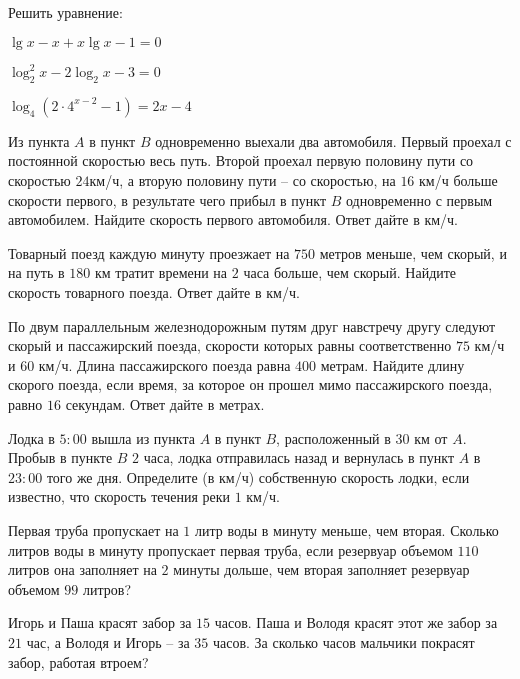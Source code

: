 \begin{listofex}
	\item Решить уравнение:
	\begin{enumcols}[itemcolumns=2]
		\item {}
		\item {}
		\item {}
		\item \( \lg x - x + x\lg x - 1 = 0 \)
		\item \( \log^2_2x-2\log_2 x - 3 = 0 \)
		\item \( \log_4(2\cdot4^{x-2}-1)=2x-4 \)
		\item {}
		\item {}
		\item {}
	\end{enumcols}
	\item {}
	\item {}
	\item Из пункта \( A \) в пункт \( B \) одновременно выехали два автомобиля. Первый проехал с постоянной скоростью весь путь. Второй проехал первую половину пути со скоростью \( 24 \)км/ч, а вторую половину пути – со скоростью, на \(16\) км/ч больше скорости первого, в результате чего прибыл в пункт \( B \) одновременно с первым автомобилем. Найдите скорость первого автомобиля. Ответ дайте в км/ч.
	\item Товарный поезд каждую минуту проезжает на \( 750 \) метров меньше, чем скорый, и на путь в \( 180 \) км тратит времени на \( 2 \) часа больше, чем скорый. Найдите скорость товарного поезда. Ответ дайте в км/ч.
	\item По двум параллельным железнодорожным путям друг навстречу другу следуют скорый и пассажирский поезда, скорости которых равны соответственно \( 75  \) км/ч и \( 60  \) км/ч. Длина пассажирского поезда равна \( 400  \) метрам. Найдите длину скорого поезда, если время, за которое он прошел мимо пассажирского поезда, равно \( 16  \) секундам. Ответ дайте в метрах.
	\item Лодка в \( 5:00  \) вышла из пункта \( A \) в пункт \( B \), расположенный в \( 30  \) км от \( A \). Пробыв в пункте \( B \) \( 2 \) часа, лодка отправилась назад и вернулась в пункт \( A \) в \( 23:00 \) того же дня. Определите (в км/ч) собственную скорость лодки, если известно, что скорость течения реки \( 1 \) км/ч.
	\item Первая труба пропускает на \(1\) литр воды в минуту меньше, чем вторая. Сколько литров воды в минуту пропускает первая труба, если резервуар объемом \(110\) литров она заполняет на \( 2 \) минуты дольше, чем вторая заполняет резервуар объемом \(99\) литров?
	\item Игорь и Паша красят забор за \( 15 \) часов. Паша и Володя красят этот же забор за \( 21 \) час, а Володя и Игорь – за \( 35 \) часов. За сколько часов мальчики покрасят забор, работая втроем?
\end{listofex}
